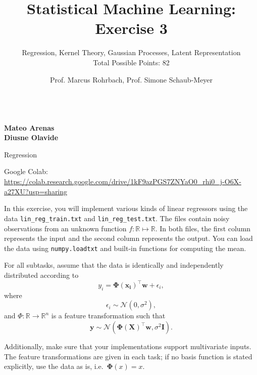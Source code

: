 \documentclass[
	english,
        solution=true
	]{tudaexercise}
\begin{document}
\author{Prof. Marcus Rohrbach, Prof. Simone Schaub-Meyer}
\title[Statistical Machine Learning Exercise 3]{\LARGE Statistical Machine Learning: Exercise 3}
\subtitle{Regression, Kernel Theory, Gaussian Processes, Latent Representation \\ Total Possible Points: 82}
\maketitle

\\
\textbf{Mateo Arenas}\\
\textbf{Diusne Olavide}

\begin{task}[points=34]{Regression}
    \begin{programmingtaskbox}
        Google Colab: \url{https://colab.research.google.com/drive/1kF9azPGS7ZNYaO0_rhi0_j-O6X-a27XU?usp=sharing}
    \end{programmingtaskbox}

    In this exercise, you will implement various kinds of linear regressors using the data \texttt{lin\_reg\_train.txt} and \texttt{lin\_reg\_test.txt}.
    The files contain noisy observations from an unknown function $f: \mathbb{R} \mapsto \mathbb{R}$.
    In both files, the first column represents the input and the second column represents the output.
    You can load the data using \texttt{numpy.loadtxt} and built-in functions for computing the mean.

    For all subtasks, assume that the data is identically and independently distributed according to
    \begin{equation*}
        y_i = \bm{\Phi}(\mathbf{x_i})^\top \mathbf{w} + \epsilon_i,
    \end{equation*}
    where
    \begin{equation*}
        \epsilon_i \sim \mathcal{N}(0, \sigma^2),
    \end{equation*}
    and $\Phi: \mathbb{R} \rightarrow \mathbb{R}^n$ is a feature transformation such that
    \begin{equation*}
        \mathbf{y} \sim \mathcal{N}(\bm{\Phi}(\mathbf{X})^\top \mathbf{w}, \sigma^2 \mathbf{I}).
    \end{equation*}

    Additionally, make sure that your implementations support multivariate inputs. The feature transformations
    are given in each task; if no basis function is stated explicitly, use the data as is, i.e.~$\bm{\Phi}(x) = x$.


\end{task}
\end{document}
